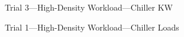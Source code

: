 \documentclass[10pt]{report}
\begin{document}
\begin{landscape}
\begin{figure}[!h]
    \caption{Trial 3---High-Density Workload---Chiller KW}
\end{figure}
\begin{figure}[!h]
  \centering

    \caption{Trial 1---High-Density Workload---Chiller Loads}
\end{figure}
\begin{figure}[!h]
  \centering


\end{figure}
\end{landscape}
\end{document}
